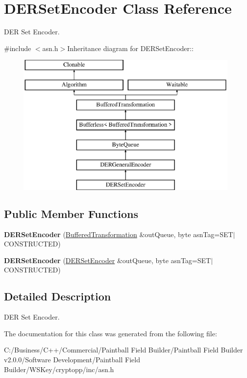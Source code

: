 \hypertarget{class_d_e_r_set_encoder}{
\section{DERSetEncoder Class Reference}
\label{class_d_e_r_set_encoder}
}


DER Set Encoder.  


{\ttfamily \#include $<$asn.h$>$}Inheritance diagram for DERSetEncoder::\begin{figure}[H]
\begin{center}
\leavevmode
\includegraphics[height=7cm]{class_d_e_r_set_encoder}
\end{center}
\end{figure}
\subsection*{Public Member Functions}
\begin{DoxyCompactItemize}
\item 
\hypertarget{class_d_e_r_set_encoder_a64721fd0b27a3f8f5ff699af00c0c830}{
{\bfseries DERSetEncoder} (\hyperlink{class_buffered_transformation}{BufferedTransformation} \&outQueue, byte asnTag=SET$|$CONSTRUCTED)}
\label{class_d_e_r_set_encoder_a64721fd0b27a3f8f5ff699af00c0c830}

\item 
\hypertarget{class_d_e_r_set_encoder_aa793a3f0ca0aa6e6e717dd8e5cf8d1b6}{
{\bfseries DERSetEncoder} (\hyperlink{class_d_e_r_set_encoder}{DERSetEncoder} \&outQueue, byte asnTag=SET$|$CONSTRUCTED)}
\label{class_d_e_r_set_encoder_aa793a3f0ca0aa6e6e717dd8e5cf8d1b6}

\end{DoxyCompactItemize}


\subsection{Detailed Description}
DER Set Encoder. 

The documentation for this class was generated from the following file:\begin{DoxyCompactItemize}
\item 
C:/Business/C++/Commercial/Paintball Field Builder/Paintball Field Builder v2.0.0/Software Development/Paintball Field Builder/WSKey/cryptopp/inc/asn.h\end{DoxyCompactItemize}
